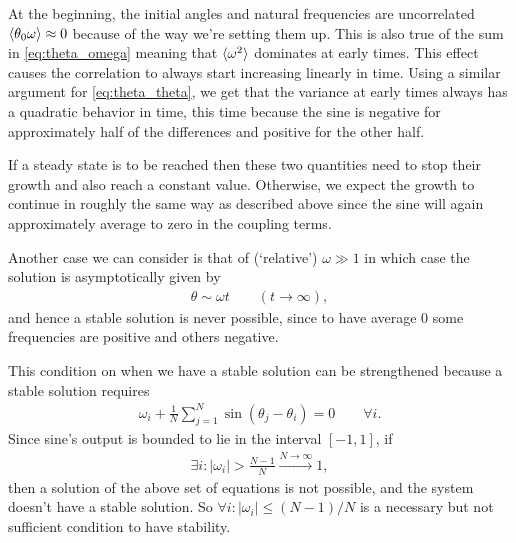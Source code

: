 \documentclass[10pt,a4paper,twocolumn]{article}
\begin{document}
At the beginning, the initial angles and natural frequencies are uncorrelated $\braket{\theta_0 \omega} \approx 0$ because of the way we're setting them up. This is also true of the sum in \cref{eq:theta_omega} meaning that $\braket{\omega^2}$ dominates at early times. This effect causes the correlation to always start increasing linearly in time. Using a similar argument for \cref{eq:theta_theta}, we get that the variance at early times always has a quadratic behavior in time, this time because the sine is negative for approximately half of the differences and positive for the other half.

If a steady state is to be reached then these two quantities need to stop their growth and also reach a constant value. Otherwise, we expect the growth to continue in roughly the same way as described above since the sine will again approximately average to zero in the coupling terms.

Another case we can consider is that of (`relative') $\omega \gg 1$ in which case the solution is asymptotically given by
%
\begin{align}
    \theta \sim \omega t \quad \quad (t \rightarrow \infty),
\end{align}
%
and hence a stable solution is never possible, since to have average $0$ some frequencies are positive and others negative.

This condition on when we have a stable solution can be strengthened because a stable solution requires
%
\begin{align}\label{eq:Estats}
    \omega_i + \frac{1}{N} \sum_{j=1}^N \sin(\theta_j - \theta_i) = 0 \quad \quad \forall i.
\end{align}
%
Since sine's output is bounded to lie in the interval $[-1, 1]$, if
%
\begin{align}
    \exists i : |\omega_i| > \frac{N - 1}{N}  \stackrel{N \rightarrow 
    \infty}{\longrightarrow} 1,
\end{align}
%
then a solution of the above set of equations is not possible, and the system doesn't have a stable solution. So $\forall i: |\omega_i| \leq (N - 1)/ N$ is a necessary but not sufficient condition to have stability.
\end{document}
